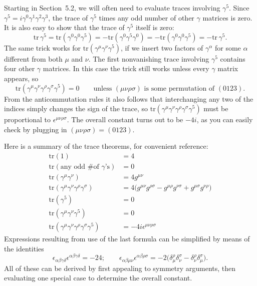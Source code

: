 Starting in Section~5.2, we will often need to evaluate traces involving
$\gamma^5$.  Since $\gamma^5 = i\gamma^0\gamma^1\gamma^2\gamma^3$, the trace
of $\gamma^5$ times any odd number of other $\gamma$ matrices is zero.  It is
also easy to show that the trace of $\gamma^5$ itself is zero:
\begin{equation}
  \mathrm{tr}\,\gamma^5 = \mathrm{tr}(\gamma^0\gamma^0\gamma^5)
    = -\mathrm{tr}(\gamma^0\gamma^5\gamma^0)
    = -\mathrm{tr}(\gamma^0\gamma^0\gamma^5) = -\mathrm{tr}\,\gamma^5 .
\end{equation}
The same trick works for $\mathrm{tr}(\gamma^\mu\gamma^\nu\gamma^5)$, if we
insert two factors of $\gamma^\alpha$ for some $\alpha$ different from both
$\mu$ and $\nu$.  The first nonvanishing trace involving $\gamma^5$ contains
four other $\gamma$ matrices.  In this case the trick still works unless every
$\gamma$ matrix appears, so
\begin{equation}
  \mathrm{tr}(\gamma^\mu\gamma^\nu\gamma^\rho\gamma^\sigma\gamma^5) = 0
  \qquad\text{unless } (\mu\nu\rho\sigma) \text{ is some permutation of }
    (0123).
\end{equation}
From the anticommutation rules it also follows that interchanging any two of
the indices simply changes the sign of the trace, so
$\mathrm{tr}(\gamma^\mu\gamma^\nu\gamma^\rho\gamma^\sigma\gamma^5)$ must be
proportional to $\epsilon^{\mu\nu\rho\sigma}$.  The overall constant turns out
to be $-4i$, as you can easily check by plugging in
$(\mu\nu\rho\sigma) = (0123)$.

Here is a summary of the trace theorems, for convenient reference:
\begin{equation}
  \begin{aligned}
    \mathrm{tr}(1) &= 4\\
    \mathrm{tr}(\text{any odd \# of }\gamma\text{'s}) &= 0\\
    \mathrm{tr}(\gamma^\mu\gamma^\nu) &= 4g^{\mu\nu}\\
    \mathrm{tr}(\gamma^\mu\gamma^\nu\gamma^\rho\gamma^\sigma)
      &= 4\bigl( g^{\mu\nu}g^{\rho\sigma} - g^{\mu\rho}g^{\nu\sigma}
        + g^{\mu\sigma}g^{\nu\rho} \bigr)\\
    \mathrm{tr}(\gamma^5) &= 0\\
    \mathrm{tr}(\gamma^\mu\gamma^\nu\gamma^5) &= 0\\
    \mathrm{tr}(\gamma^\mu\gamma^\nu\gamma^\rho\gamma^\sigma\gamma^5)
      &= -4i\epsilon^{\mu\nu\rho\sigma}
  \end{aligned}
  \label{eq:5.5}
\end{equation}
Expressions resulting from use of the last formula can be simplified by means
of the identities
\begin{equation}
  \epsilon_{\alpha\beta\gamma\delta}\epsilon^{\alpha\beta\gamma\delta}
    = -24;\qquad
  \epsilon_{\alpha\beta\mu\nu}\epsilon^{\alpha\beta\rho\sigma}
    = -2\bigl( \delta^\rho_\mu\delta^\sigma_\nu
      - \delta^\rho_\nu\delta^\sigma_\mu \bigr) .
  \label{eq:5.6}
\end{equation}
All of these can be derived by first appealing to symmetry arguments, then
evaluating one special case to determine the overall constant.

